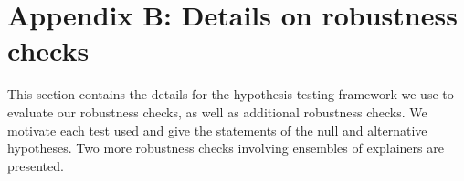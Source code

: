 \documentclass[mnsc,blindrev]{informs3}
\begin{document}
    
    
    
   

    
    
    
    
    
    
   
    
    
    \section*{Appendix B: Details on robustness checks}
        \label{apx_sec:mitigation_details}
        This section contains the details for the hypothesis testing framework we use to evaluate our robustness checks, as well as additional robustness checks. We motivate each test used and give the statements of the null and alternative hypotheses. Two more robustness checks involving ensembles of explainers are presented. 
        
\end{document}
